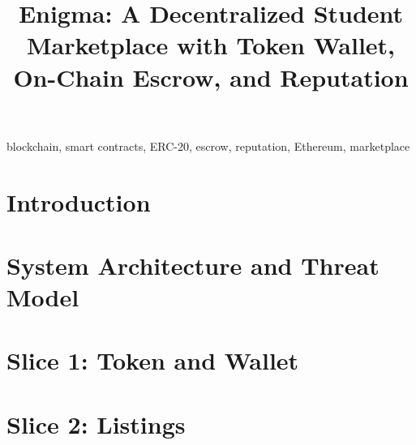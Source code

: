 \documentclass[conference]{IEEEtran}
\begin{document}
\title{Enigma: A Decentralized Student Marketplace with Token Wallet, On-Chain Escrow, and Reputation}

\author{%
}

\maketitle

\begin{abstract}

\end{abstract}

\begin{IEEEkeywords}
blockchain, smart contracts, ERC-20, escrow, reputation, Ethereum, marketplace
\end{IEEEkeywords}

\section{Introduction}
\label{sec:intro}


\section{System Architecture and Threat Model}
\label{sec:arch}


\section{Slice 1: Token and Wallet}
\label{sec:slice1}


\section{Slice 2: Listings}
\label{sec:slice2}

\end{document}
